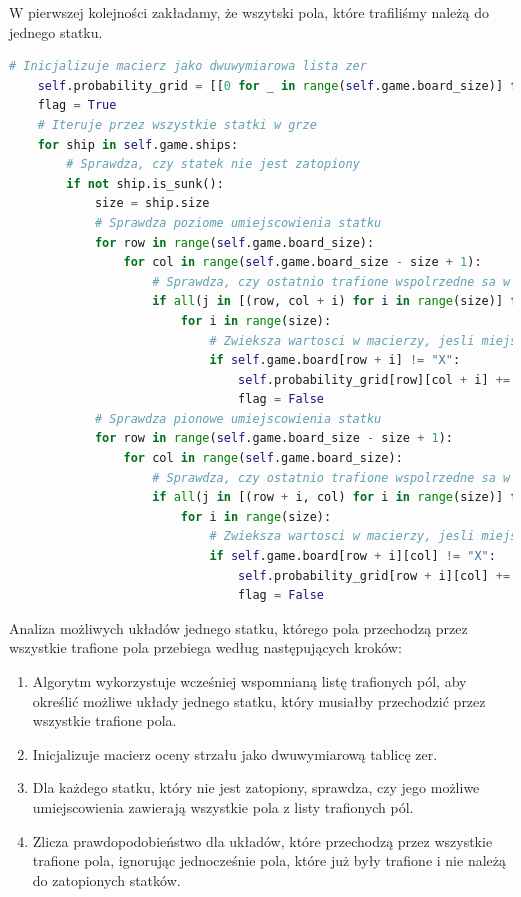 \documentclass[magisterska]{pracadypl}
\begin{document}
W pierwszej kolejności zakładamy, że wszytski pola, które trafiliśmy należą do jednego statku.
\begin{lstlisting}[language=Python, caption=Fragment kodu metody update\_probability\_grid\_hitted\_ship  klasy ProbabilityStrategy ] 
    # Inicjalizuje macierz jako dwuwymiarowa lista zer
    self.probability_grid = [[0 for _ in range(self.game.board_size)] for _ in range(self.game.board_size)]
    flag = True
    # Iteruje przez wszystkie statki w grze
    for ship in self.game.ships:
        # Sprawdza, czy statek nie jest zatopiony
        if not ship.is_sunk():
            size = ship.size
            # Sprawdza poziome umiejscowienia statku
            for row in range(self.game.board_size):
                for col in range(self.game.board_size - size + 1):
                    # Sprawdza, czy ostatnio trafione wspolrzedne sa w danym umiejscowieniu
                    if all(j in [(row, col + i) for i in range(size)] for j in self.last_hitted) and all(self.game.board[row][col + i] in [" ", "S", "X"] for i in range(size)):
                        for i in range(size):
                            # Zwieksza wartosci w macierzy, jesli miejsce nie jest juz trafione
                            if self.game.board[row + i] != "X":
                                self.probability_grid[row][col + i] += 1
                                flag = False
            # Sprawdza pionowe umiejscowienia statku
            for row in range(self.game.board_size - size + 1):
                for col in range(self.game.board_size):
                    # Sprawdza, czy ostatnio trafione wspolrzedne sa w danym umiejscowieniu
                    if all(j in [(row + i, col) for i in range(size)] for j in self.last_hitted) and all(self.game.board[row + i][col] in [" ", "S", "X"] for i in range(size)):
                        for i in range(size):
                            # Zwieksza wartosci w macierzy, jesli miejsce nie jest juz trafione
                            if self.game.board[row + i][col] != "X":
                                self.probability_grid[row + i][col] += 1
                                flag = False
\end{lstlisting}
Analiza możliwych układów jednego statku, którego pola przechodzą przez wszystkie trafione pola przebiega według następujących kroków:
\begin{enumerate}
\item Algorytm wykorzystuje wcześniej wspomnianą listę trafionych pól, aby określić możliwe układy jednego statku, który musiałby przechodzić przez wszystkie trafione pola.
\item Inicjalizuje macierz oceny strzału jako dwuwymiarową tablicę zer.
\item Dla każdego statku, który nie jest zatopiony, sprawdza, czy jego możliwe umiejscowienia zawierają wszystkie pola z listy trafionych pól.
\item Zlicza prawdopodobieństwo dla układów, które przechodzą przez wszystkie trafione pola, ignorując jednocześnie pola, które już były trafione i nie należą do zatopionych statków.
\end{enumerate}
\end{document}
